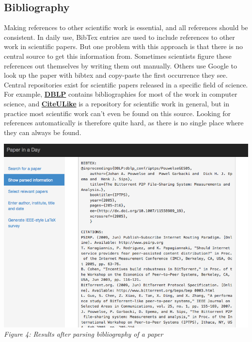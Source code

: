 \documentclass[12pt]{article}
\begin{document}
\subsection{Bibliography}
Making references to other scientific work is essential, and all references should be consistent. In daily use, BibTex entries are used to include references to other work in scientific papers. But one problem with this approach is that there is no central source to get this information from. Sometimes scientists figure these references out themselves by writing them out manually. Others use Google to look up the paper with bibtex and copy-paste the first occurrence they see. Central repositories exist for scientific papers released in a specific field of science. For example, \textbf{\href{http://dblp.uni-trier.de/db/}{DBLP}} contains bibliographies for most of the work in computer science, and \textbf{\href{http://www.citeulike.org/}{CiteULike}} is a repository for scientific work in general, but in practice most scientific work can't even be found on this source. Looking for references automatically is therefore quite hard, as there is no single place where they can always be found.

\includegraphics[width=17cm]{../screenshots/bibtex.png}
\textit{\\Figure 4: Results after parsing bibliography of a paper}\\\\
\end{document}
